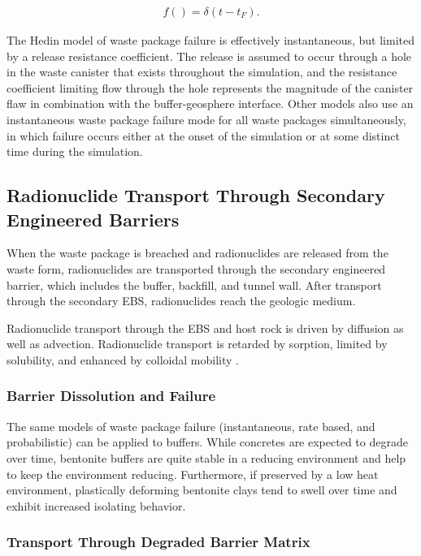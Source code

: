 \begin{align}
  f()= \delta(t-t_F).
  \label{instantaneous}
\end{align}


The Hedin model of waste package failure is effectively instantaneous, but
limited by a release resistance coefficient. The release is assumed  to occur
through a hole in the waste canister that exists throughout the simulation, and
the resistance coefficient limiting flow through the hole represents the
magnitude of the canister flaw in combination with the buffer-geosphere
interface\cite{hedin_integrated_2002}.  Other models also use an instantaneous 
waste package failure mode for all waste  packages simultaneously, in which 
failure occurs either at the onset of the simulation or at some distinct time 
during the simulation. 




\subsection{Radionuclide Transport Through Secondary Engineered Barriers}

When the waste package is breached and radionuclides are released from the waste 
form, radionuclides are transported through the secondary engineered barrier, 
which includes the buffer, backfill, and tunnel wall. After transport through 
the secondary \gls{EBS}, radionuclides reach the geologic medium. 

Radionuclide transport through the \gls{EBS} and host rock is driven by 
diffusion as well as advection. Radionuclide transport is retarded by sorption, 
limited by solubility, and enhanced by colloidal mobility 
\cite{bracke_safety_2008}. 

\subsubsection{Barrier Dissolution and Failure}

The same models of waste package failure (instantaneous, rate based, and 
probabilistic) can be applied to buffers. While concretes are expected to 
degrade over time, bentonite buffers are quite stable in a reducing 
environment and help to keep the environment reducing. Furthermore, if 
preserved by a low heat environment, plastically deforming bentonite
clays tend to swell over time and exhibit increased isolating behavior.

\subsubsection{Transport Through Degraded Barrier Matrix}


